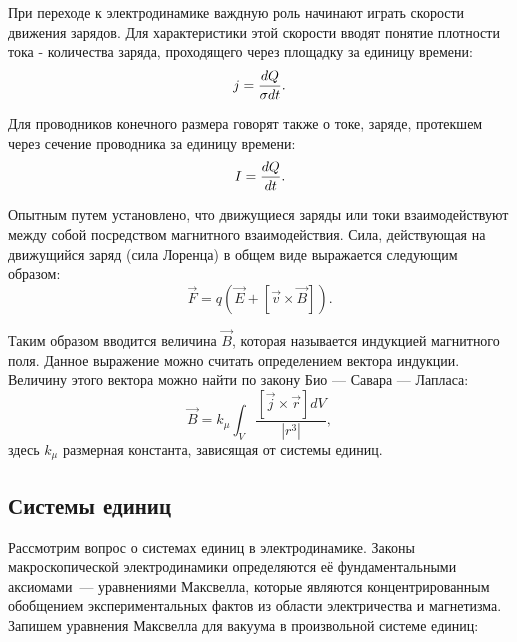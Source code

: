 При переходе к электродинамике важдную роль начинают играть скорости движения зарядов. Для характеристики этой скорости вводят понятие плотности тока - количества заряда, проходящего через площадку за единицу времени:
\begin{equation}
	\eqmark
	j = \frac{dQ}{\sigma dt}.
\end{equation}

Для проводников конечного размера говорят также о токе, заряде, протекшем через сечение проводника за единицу времени:
\begin{equation}
	\eqmark[current]
	I = \frac{dQ}{dt}.
\end{equation}

Опытным путем установлено, что движущиеся заряды или токи взаимодействуют между собой посредством магнитного взаимодействия. Сила, действующая на движущийся заряд (сила Лоренца) в общем виде выражается следующим образом:
\begin{equation}
	\vec{F} = q \left( \vec{E} + \left[ \vec{v} \times \vec{B}\right] \right).
\end{equation}

Таким образом вводится величина $\vec{B}$, которая называется индукцией магнитного поля. Данное выражение можно считать определением вектора индукции. Величину этого вектора можно найти по закону Био — Савара — Лапласа:
\begin{equation}
	\vec{B} = k_{\mu}\int_{V}{\frac{\left[ \vec{j} \times \vec{r}\right] dV}{\left| r^3 \right| }},
\end{equation}
здесь $k_{\mu}$ размерная константа, зависящая от системы единиц.

\subsection{Системы единиц}

Рассмотрим вопрос о системах единиц в электродинамике. Законы макроскопической электродинамики определяются её фундаментальными аксиомами~--- уравнениями Максвелла, которые являются концентрированным обобщением экспериментальных фактов из области электричества и магнетизма. Запишем уравнения Максвелла для вакуума в произвольной системе единиц:



